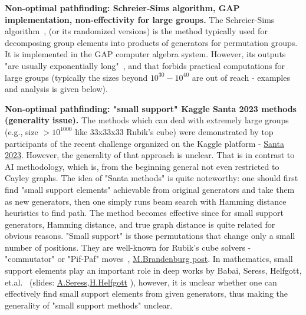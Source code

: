 \documentclass[atmp]{ipart_v1}
\numberwithin{equation}{section}
\theoremstyle{plain}%
\begin{document}
{\bf Non-optimal pathfinding: Schreier-Sims algorithm, GAP implementation, non-effectivity for large groups.} 
The Schreier-Sims algorithm~\cite{sims1970computational},\cite{knuth1991efficient} (or its randomized versions) is the method typically used for decomposing group elements into products of generators for permutation groups. It is implemented in the GAP computer algebra system. However, its outputs "are usually exponentially long"~\cite{fiat1989planning}, and that forbids practical computations for large groups (typically the sizes beyond $10^{30}-10^{40}$ are out of reach - examples and analysis is given below). 

{\bf Non-optimal pathfinding: "small support" Kaggle Santa 2023 methods (generality issue).} The methods which can deal with extremely large groups (e.g., size $>10^{1000}$ like 33x33x33 Rubik's cube) were demonstrated by top participants of the recent challenge organized on the Kaggle platform - \href{https://www.kaggle.com/competitions/santa-2023}{Santa 2023}. However, the generality of that approach is unclear. %
That is in contrast to AI methodology, which is, from the beginning general not even restricted to Cayley graphs. The idea of "Santa methods" is quite noteworthy:  one should first find "small support elements" achievable from original generators and take them as new generators, then one simply runs beam search with Hamming distance heuristics to find path. The method becomes effective since for small support generators, Hamming distance, and true graph distance is quite related for obvious reasons. "Small support" is those permutations that change only a small number of positions. They are well-known for  Rubik's cube solvers - "commutator" or "Pif-Paf" moves~\cite{mulholland2016permutation}, \href{https://math.stackexchange.com/q/4962862/21498}{M.Brandenburg post}. In mathematics, small support elements play an important role in deep works by Babai, Seress, Helfgott, et.al.~\cite{babai1988diameter, babai2004diameter, bamberg2014bounds, helfgott2014diameter, helfgott2019growth} (slides: \href{https://www.math.auckland.ac.nz/~conder/SODO-2012/Seress-SODO2012.pdf}{A.Seress},\href{https://simons.berkeley.edu/sites/default/files/docs/6206/symtalk.pdf}{H.Helfgott} ), however, it is 
unclear whether one can effectively find small support elements from given generators, thus making the generality of "small support methods" unclear.
\end{document}
